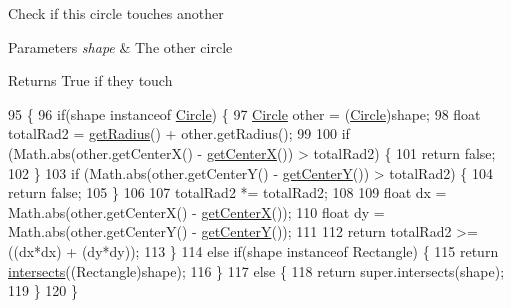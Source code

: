 Check if this circle touches another


\begin{DoxyParams}{Parameters}
{\em shape} & The other circle \\
\hline
\end{DoxyParams}
\begin{DoxyReturn}{Returns}
True if they touch 
\end{DoxyReturn}

\begin{DoxyCode}
95                                            \{
96         \textcolor{keywordflow}{if}(shape instanceof \mbox{\hyperlink{classorg_1_1newdawn_1_1slick_1_1geom_1_1_circle_a4cdb3cb7dcabd983bfaa2ec623333e5a}{Circle}}) \{
97             \mbox{\hyperlink{classorg_1_1newdawn_1_1slick_1_1geom_1_1_circle_a4cdb3cb7dcabd983bfaa2ec623333e5a}{Circle}} other = (\mbox{\hyperlink{classorg_1_1newdawn_1_1slick_1_1geom_1_1_circle_a4cdb3cb7dcabd983bfaa2ec623333e5a}{Circle}})shape;
98             \textcolor{keywordtype}{float} totalRad2 = \mbox{\hyperlink{classorg_1_1newdawn_1_1slick_1_1geom_1_1_circle_a3d83f7477c608a767ced2622440a528a}{getRadius}}() + other.getRadius();
99             
100             \textcolor{keywordflow}{if} (Math.abs(other.getCenterX() - \mbox{\hyperlink{classorg_1_1newdawn_1_1slick_1_1geom_1_1_circle_a54401470f8ee5f99c2013ca06e7cb057}{getCenterX}}()) > totalRad2) \{
101                 \textcolor{keywordflow}{return} \textcolor{keyword}{false};
102             \}
103             \textcolor{keywordflow}{if} (Math.abs(other.getCenterY() - \mbox{\hyperlink{classorg_1_1newdawn_1_1slick_1_1geom_1_1_circle_a3e64722eb886a7936ce75199e94e1e48}{getCenterY}}()) > totalRad2) \{
104                 \textcolor{keywordflow}{return} \textcolor{keyword}{false};
105             \}
106             
107             totalRad2 *= totalRad2;
108             
109             \textcolor{keywordtype}{float} dx = Math.abs(other.getCenterX() - \mbox{\hyperlink{classorg_1_1newdawn_1_1slick_1_1geom_1_1_circle_a54401470f8ee5f99c2013ca06e7cb057}{getCenterX}}());
110             \textcolor{keywordtype}{float} dy = Math.abs(other.getCenterY() - \mbox{\hyperlink{classorg_1_1newdawn_1_1slick_1_1geom_1_1_circle_a3e64722eb886a7936ce75199e94e1e48}{getCenterY}}());
111             
112             \textcolor{keywordflow}{return} totalRad2 >= ((dx*dx) + (dy*dy));
113         \}
114         \textcolor{keywordflow}{else} \textcolor{keywordflow}{if}(shape instanceof Rectangle) \{
115             \textcolor{keywordflow}{return} \mbox{\hyperlink{classorg_1_1newdawn_1_1slick_1_1geom_1_1_circle_a43871352a37b105ea470981d89a178cc}{intersects}}((Rectangle)shape);
116         \}
117         \textcolor{keywordflow}{else} \{
118             \textcolor{keywordflow}{return} super.intersects(shape);
119         \}
120     \}
\end{DoxyCode}
\mbox{\label{classorg_1_1newdawn_1_1slick_1_1geom_1_1_circle_acccb06500e92cfd3908c49fc4c2f69b7}} 
